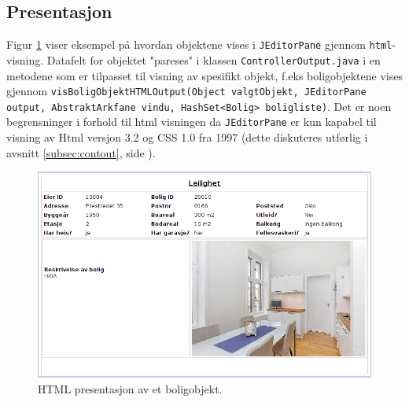 \subsection{Presentasjon}
Figur \ref{fig:presentasjon} viser eksempel på hvordan objektene vises i \texttt{JEditorPane} gjennom \texttt{html}-visning. Datafelt for objektet "pareses" i klassen \texttt{ControllerOutput.java} i en metodene som er tilpasset til visning av spesifikt objekt, f.eks boligobjektene vises gjennom \texttt{visBoligObjektHTMLOutput(Object valgtObjekt, JEditorPane output, AbstraktArkfane vindu, HashSet<Bolig> boligliste)}. Det er noen begrensninger i forhold til html visningen da \texttt{JEditorPane} er kun kapabel til visning av Html versjon 3.2 og CSS 1.0 fra 1997 (dette diskuteres utførlig i avsnitt \ref{subsec:contout}, side \pageref{subsec:contout}). 

\begin{figure}[ht!]
 \includegraphics[width=\textwidth,height=\textheight,keepaspectratio]{./img/produktdokumentasjon/visuelle_detaljer/presentasjon.png}
 \caption{HTML presentasjon av et boligobjekt.}
 \label{fig:presentasjon}
\end{figure}


